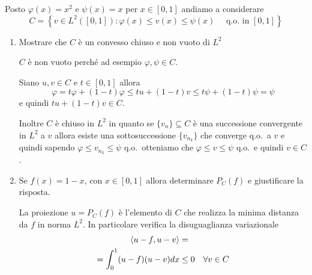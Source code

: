 \begin{eser}
    Posto \(\varphi {(x)} = x^2\) e \(\psi {(x)} = x\) per \(x \in [0, 1]\)
    andiamo a considerare
    \[
    C = \left\{ v \in L^2{([0,1])} : \varphi {(x)} \le v{(x)} \le \psi {(x)}
\quad \text{ q.o.~in } [0,1] \right\}
    \]
\begin{enumerate}[label = \alph*.]
    \item Mostrare che \(C\) è un convesso chiuso e non vuoto di \(L^2\) 

        \(C\) è non vuoto perché ad esempio \(\varphi, \psi \in C \). 

        Siano \(u, v \in C\) e \(t \in [0, 1]\) allora 
        \[
          \varphi  = t\varphi  + {(1-t)}\varphi  \le tu + {(1-t)}v  \le t
          \psi + {(1-t)}\psi  = \psi 
        \]
        e quindi \(tu + {(1-t)}v \in C\).

        Inoltre \(C\) è chiuso in \(L^2\) in quanto se \(\{v_{n}\} \subseteq C\)
        è una successione convergente in \(L^2\) a \(v\) allora esiste una
        sottosuccessione \(\{v_{n_{k}}\}\) che converge q.o.~a \(v\) e quindi
        sapendo \(\varphi \le v_{n_k} \le \psi\) q.o.~otteniamo che \(\varphi
        \le v \le \psi\) q.o.~e quindi \(v \in C\).
    \item Se \(f{(x)} = 1-x\), con \(x \in [0,1]\) allora determinare
        \(P_C{(f)}\) e giustificare la risposta.

    \begin{minipage}{0.5\textwidth}
        \vspace*{0pt}
        La proiezione \(u = P_C{(f)}\) è l'elemento di \(C\) che realizza la
        minima distanza da \(f\) in norma \(L^2\). In particolare verifica la
        disuguaglianza variazionale
        \begin{align*}
            {\left\langle u-f, u-v\right\rangle} &= \\ = \int_{0}^{1} (u-f)(u-v)dx &\le 0 \quad \forall v
            \in C
        \end{align*}
    \end{minipage}\hfill
    \begin{minipage}{0.4\textwidth}
        \vspace*{0pt}
    \end{minipage}


\end{enumerate}
\end{eser}
